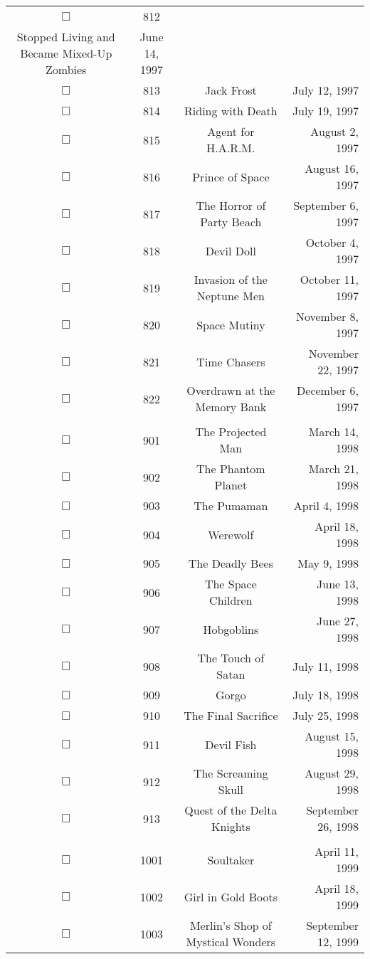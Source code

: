 \documentclass[12pt]{article}
\begin{document}
\begin{center}
\begin{longtable}[c]{cccr}
$\Box$&812&\begin{tabular}{@{}c@{}}The Incredibly Strange Creatures Who\\Stopped Living and Became Mixed-Up Zombies\end{tabular}&June 14, 1997\\
$\Box$&813&Jack Frost&July 12, 1997\\
$\Box$&814&Riding with Death&July 19, 1997\\
$\Box$&815&Agent for H.A.R.M.&August  2, 1997\\
$\Box$&816&Prince of Space&August 16, 1997\\
$\Box$&817&The Horror of Party Beach&September  6, 1997\\
$\Box$&818&Devil Doll&October  4, 1997\\
$\Box$&819&Invasion of the Neptune Men&October 11, 1997\\
$\Box$&820&Space Mutiny&November  8, 1997\\
$\Box$&821&Time Chasers&November 22, 1997\\
$\Box$&822&Overdrawn at the Memory Bank&December  6, 1997\\
\\
$\Box$&901&The Projected Man&March 14, 1998\\
$\Box$&902&The Phantom Planet&March 21, 1998\\
$\Box$&903&The Pumaman&April  4, 1998\\
$\Box$&904&Werewolf&April 18, 1998\\
$\Box$&905&The Deadly Bees&May  9, 1998\\
$\Box$&906&The Space Children&June 13, 1998\\
$\Box$&907&Hobgoblins&June 27, 1998\\
$\Box$&908&The Touch of Satan&July 11, 1998\\
$\Box$&909&Gorgo&July 18, 1998\\
$\Box$&910&The Final Sacrifice&July 25, 1998\\
$\Box$&911&Devil Fish&August 15, 1998\\
$\Box$&912&The Screaming Skull&August 29, 1998\\
$\Box$&913&Quest of the Delta Knights&September 26, 1998\\
\\
$\Box$&1001&Soultaker&April 11, 1999\\
$\Box$&1002&Girl in Gold Boots&April 18, 1999\\
$\Box$&1003&Merlin's Shop of Mystical Wonders&September 12, 1999\\

\end{longtable}
\end{center}
\end{document}
